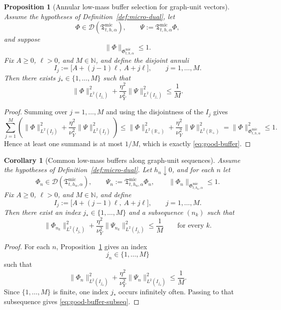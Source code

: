 \documentclass[11pt,a4paper]{amsart}
\theoremstyle{plain}
\newtheorem{proposition}[theorem]{Proposition}
\newtheorem{corollary}[theorem]{Corollary}
\theoremstyle{definition}
\theoremstyle{remark}
\newcommand{\R}{\mathbb{R}}
\begin{document}
\begin{proposition}[Annular low-mass buffer selection for graph-unit vectors]
\label{prop:good-buffer}
Assume the hypotheses of Definition~\ref{def:micro-dual}, let
\[
\Phi\in\mathcal D(\mathfrak T_{t,h,\alpha}^{\mathrm{mic}}),
\qquad
\Psi:=\mathfrak T_{t,h,\alpha}^{\mathrm{mic}}\Phi,
\]
and suppose
\[
\|\Phi\|_{\mathfrak G_{t,h,\alpha}^{\mathrm{mic}}}\le1.
\]
Fix \(A\ge0\), \(\ell>0\), and \(M\in\mathbb N\), and define the disjoint annuli
\[
I_j:=\bigl[A+(j-1)\ell,\ A+j\ell\bigr],
\qquad j=1,\dots,M.
\]
Then there exists \(j_*\in\{1,\dots,M\}\) such that
\begin{equation}\label{eq:good-buffer}
\|\Phi\|_{L^2(I_{j_*})}^2
+
\frac{\eta^2}{\nu_Y^2}
\|\Psi\|_{L^2(I_{j_*})}^2
\le
\frac{1}{M}.
\end{equation}
\end{proposition}

\begin{proof}
Summing over \(j=1,\dots,M\) and using the disjointness of the \(I_j\) gives
\[
\sum_{j=1}^M
\left(
\|\Phi\|_{L^2(I_j)}^2
+
\frac{\eta^2}{\nu_Y^2}
\|\Psi\|_{L^2(I_j)}^2
\right)
\le
\|\Phi\|_{L^2(\R_+)}^2
+
\frac{\eta^2}{\nu_Y^2}
\|\Psi\|_{L^2(\R_+)}^2
=
\|\Phi\|_{\mathfrak G_{t,h,\alpha}^{\mathrm{mic}}}^2
\le
1.
\]
Hence at least one summand is at most \(1/M\), which is exactly \eqref{eq:good-buffer}.
\end{proof}

\begin{corollary}[Common low-mass buffers along graph-unit sequences]
\label{cor:good-buffer-sequence}
Assume the hypotheses of Definition~\ref{def:micro-dual}. Let \(h_n\downarrow0\), and for each
\(n\) let
\[
\Phi_n\in\mathcal D(\mathfrak T_{t,h_n,\alpha}^{\mathrm{mic}}),
\qquad
\Psi_n:=\mathfrak T_{t,h_n,\alpha}^{\mathrm{mic}}\Phi_n,
\qquad
\|\Phi_n\|_{\mathfrak G_{t,h_n,\alpha}^{\mathrm{mic}}}\le1.
\]
Fix \(A\ge0\), \(\ell>0\), and \(M\in\mathbb N\), and define
\[
I_j:=\bigl[A+(j-1)\ell,\ A+j\ell\bigr],
\qquad j=1,\dots,M.
\]
Then there exist an index \(j_*\in\{1,\dots,M\}\) and a subsequence \((n_k)\) such that
\begin{equation}\label{eq:good-buffer-subseq}
\|\Phi_{n_k}\|_{L^2(I_{j_*})}^2
+
\frac{\eta^2}{\nu_Y^2}
\|\Psi_{n_k}\|_{L^2(I_{j_*})}^2
\le
\frac{1}{M}
\qquad\text{for every }k.
\end{equation}
\end{corollary}

\begin{proof}
For each \(n\), Proposition~\ref{prop:good-buffer} gives an index
\[
j_n\in\{1,\dots,M\}
\]
such that
\[
\|\Phi_n\|_{L^2(I_{j_n})}^2
+
\frac{\eta^2}{\nu_Y^2}
\|\Psi_n\|_{L^2(I_{j_n})}^2
\le
\frac{1}{M}.
\]
Since \(\{1,\dots,M\}\) is finite, one index \(j_*\) occurs infinitely often. Passing to that
subsequence gives \eqref{eq:good-buffer-subseq}.
\end{proof}
\end{document}
